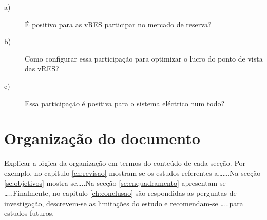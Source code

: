 \begin{description}
  \item[a)]\noindent É positivo para as vRES participar no mercado de reserva?
  \item[b)]\noindent Como configurar essa participação para optimizar o lucro do ponto de vista das vRES?
  \item[c)]\noindent Essa participação é positiva para o sistema eléctrico num todo?
\end{description}

\section{Organização do documento \label{se:organização}}

Explicar a lógica da organização em termos do conteúdo de cada secção. Por exemplo, no capitulo \ref{ch:revisao} mostram-se os estudos referentes a…….Na secção \ref{se:objetivos} mostra-se…..Na secção \ref{se:enquadramento} apresentam-se …..Finalmente, no capitulo \ref{ch:conclusao} são respondidas as perguntas de investigação, descrevem-se as limitações do estudo e recomendam-se …..para estudos futuros.


